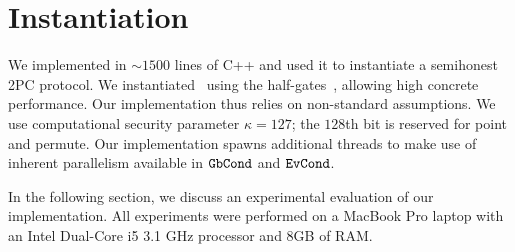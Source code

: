 \section{Instantiation}\label{sec:instantiation}

We implemented  \ourscheme in $\sim1500$ lines of C++ and used it to instantiate a semihonest 2PC protocol.
We instantiated \underscheme\ using the half-gates~\cite{EC:ZahRosEva15}, allowing high
concrete performance.
Our implementation thus relies on non-standard assumptions.
%
We use computational security parameter $\kappa=127$; the $128$th bit is reserved for point and permute.
%
Our implementation spawns additional threads to make use of inherent
parallelism available in $\mathtt{GbCond}$ and $\mathtt{EvCond}$.

In the following section, we discuss an experimental evaluation of our
implementation.
All experiments were performed on a MacBook Pro laptop with an Intel
Dual-Core i5 3.1 GHz processor and 8GB of RAM.
%
%

